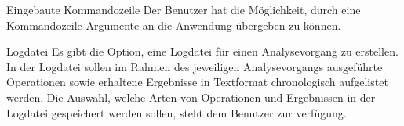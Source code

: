 \newItemPF Eingebaute Kommandozeile
\newline
Der Benutzer hat die Möglichkeit, durch eine Kommandozeile Argumente an die Anwendung übergeben zu können.

\newItemPF Logdatei
\newline
Es gibt die Option, eine Logdatei für einen Analysevorgang zu erstellen. In der Logdatei sollen im Rahmen des jeweiligen Analysevorgangs ausgeführte Operationen sowie erhaltene Ergebnisse in Textformat chronologisch aufgelistet werden. Die Auswahl, welche Arten von Operationen und Ergebnissen in der Logdatei gespeichert werden sollen, steht dem Benutzer zur verfügung.
